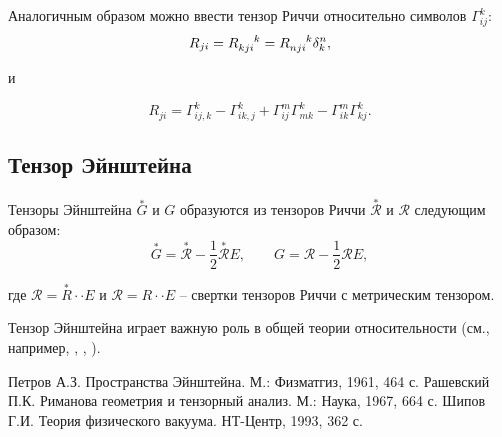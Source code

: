 \documentclass[14pt,a4paper]{extarticle}
\begin{document}
Аналогичным образом можно ввести тензор Риччи относительно символов $\Gamma_{ij}^k$:
\begin{equation}\label{eq37}
	R_{ji} = R\indices{_{kji}^k} = R\indices{_{nji}^k} \delta_k^n,
\end{equation}

и

\begin{equation}\label{eq38}
	R_{ji} = \Gamma_{ij,k}^k - \Gamma_{ik,j}^k + \Gamma_{ij}^m \Gamma_{mk}^k - \Gamma_{ik}^m \Gamma_{kj}^k.
\end{equation}


\subsection{Тензор Эйнштейна}
Тензоры Эйнштейна $\overset{*}{G}$ и $G$ образуются из тензоров Риччи $\overset{*}{\mathcal{R}}$ и $\mathcal{R}$ следующим образом:
\begin{equation}\label{eq39}
	\overset{*}{G} = \overset{*}{\mathcal{R}} - \frac{1}{2}\overset{*}{\mathcal{R}}E, \qquad G = \mathcal{R} - \frac{1}{2}\mathcal{R}E,
\end{equation}

где $\mathcal{R} = \overset{*}{R} \cdot \cdot E$ и $\mathcal{R} = R \cdot \cdot E$ -- свертки тензоров Риччи с метрическим тензором.

Тензор Эйнштейна играет важную роль в общей теории относительности (см., например, \cite{Petrov}, \cite{Rashevskiy}, \cite{Shipov}).































\clearpage
{}
\begin{thebibliography}{3}
	Петров А.З. Пространства Эйнштейна. М.: Физматгиз, 1961, 464 с.
	Рашевский П.К. Риманова геометрия и тензорный анализ. М.: Наука, 1967, 664 с.
	Шипов Г.И. Теория физического вакуума. НТ-Центр, 1993, 362 с.
\end{thebibliography}
\end{document}
